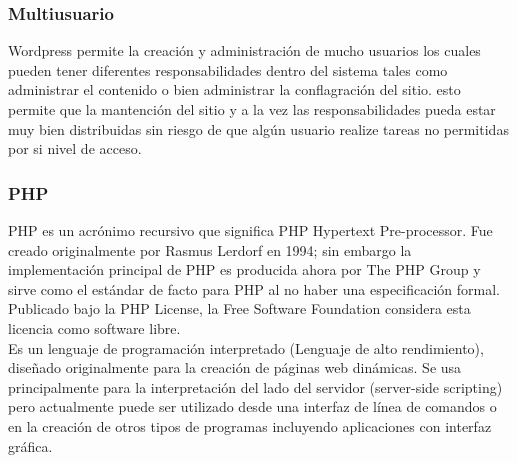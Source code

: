 \subsubsection{Multiusuario}
Wordpress permite la creación y administración de mucho usuarios los cuales pueden tener diferentes responsabilidades dentro del sistema tales como administrar el contenido o bien administrar la conflagración del sitio. esto permite que la mantención del sitio y a la vez las responsabilidades pueda estar muy bien distribuidas sin riesgo de que algún usuario realize tareas no permitidas por si nivel de acceso.

\subsubsection{PHP}
PHP es un acrónimo recursivo que significa PHP Hypertext Pre-processor. Fue creado originalmente por Rasmus Lerdorf en 1994; sin embargo la implementación principal de PHP es producida ahora por The PHP Group y sirve como el estándar de facto para PHP al no haber una especificación formal. Publicado bajo la PHP License, la Free Software Foundation considera esta licencia como software libre.\\

Es un lenguaje de programación interpretado (Lenguaje de alto rendimiento), diseñado originalmente para la creación de páginas web dinámicas. Se usa principalmente para la interpretación del lado del servidor (server-side scripting) pero actualmente puede ser utilizado desde una interfaz de línea de comandos o en la creación de otros tipos de programas incluyendo aplicaciones con interfaz gráfica.

